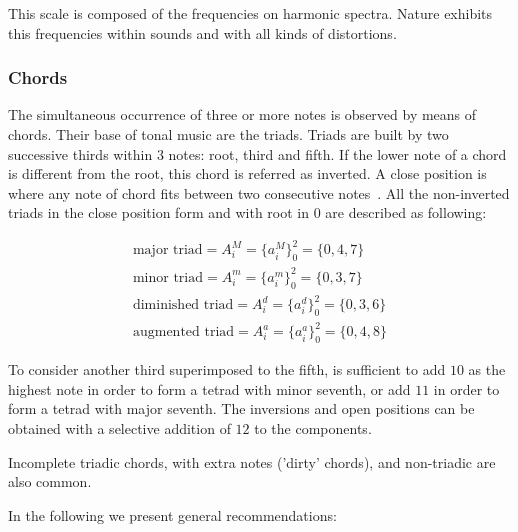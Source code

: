 \documentclass[
 aip,
 jmp,
 amsmath,amssymb,
 reprint,
]{revtex4-1}
\begin{document}
This scale is composed of the frequencies on harmonic spectra. Nature exhibits this frequencies within sounds and with all kinds of distortions.


\subsubsection{Chords}\label{subsec:acordes}

The simultaneous occurrence of three or more notes is observed by means of chords. Their
base of tonal music are the triads. Triads are built by two successive thirds
within 3 notes: root, third and fifth. If the lower note of a chord is different from the root, this chord is referred
as inverted. A close position is where any note of chord fits between two consecutive
notes~\cite{Lacerda}. All the non-inverted triads in the close position form and with root in
$0$ are described as following:

\begin{equation}\label{triades}
\begin{split}
\text{major triad} = A_i^M= \{a_i^M\}_0^2=\{0,4,7\} \\ 
\text{minor triad} = A_i^m = \{a_i^m\}_0^2=\{0,3,7\} \\
\text{diminished triad} = A_i^d = \{a_i^d\}_0^2=\{0,3,6\} \\
\text{augmented triad} = A_i^a = \{a_i^a\}_0^2=\{0,4,8\}
\end{split}
\end{equation}

To consider another third superimposed to the fifth, is sufficient to add $10$
as the highest note in order to form a tetrad with minor seventh, or add $11$ in order to form a tetrad with major
seventh. The inversions and open positions can be obtained with a selective
addition of $12$ to the components.

Incomplete triadic chords, with extra notes ('dirty' chords), and non-triadic
are also common.

In the following we present general recommendations:
\end{document}
